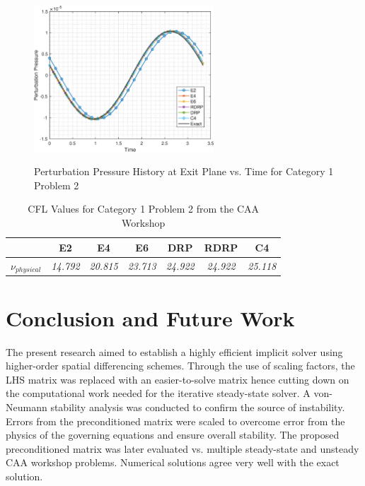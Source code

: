 \documentclass[conf]{new-aiaa}
\begin{document}
\begin{figure}[hbtp!]
	\centering
	{\includegraphics[width=0.6\textwidth]{C1P2_P_vs_Time}}
	\caption{Perturbation Pressure History at Exit Plane vs. Time for Category 1 Problem 2}
	\label{fig:C1P2_P_vs_Time}
\end{figure}


\begin{table}[htp!]
\centering
\caption{CFL Values for Category 1 Problem 2 from the CAA Workshop}
\label{tab:C1P2_CFL}
\begin{tabular}{|l|c|c|c|c|c|c|}
\hline
 & \multicolumn{1}{c|}{\textbf{E2}} & \multicolumn{1}{c|}{\textbf{E4}} & \multicolumn{1}{c|}{\textbf{E6}} & \multicolumn{1}{c|}{\textbf{DRP}} & \multicolumn{1}{c|}{\textbf{RDRP}}& \multicolumn{1}{c|}{\textbf{C4}}\\ \hline
\textbf{$\nu_{physical}$} & \textit{14.792} & \textit{20.815} & \textit{23.713} & \textit{24.922} & \textit{24.922} & \textit{25.118}\\ \hline
\end{tabular}
\end{table}

\pagebreak
\section{Conclusion and Future Work}
The present research aimed to establish a highly efficient implicit solver using higher-order spatial differencing schemes. 
Through the use of scaling factors, the LHS matrix was replaced with an easier-to-solve matrix hence cutting down on the computational work needed for the iterative steady-state solver. 
A von-Neumann stability analysis was conducted to confirm the source of instability. Errors from the preconditioned matrix were scaled to overcome error from the physics of the governing equations and ensure overall stability. 
The proposed preconditioned matrix was later evaluated vs. multiple steady-state and unsteady CAA workshop problems.
Numerical solutions agree very well with the exact solution.
 
\end{document}
